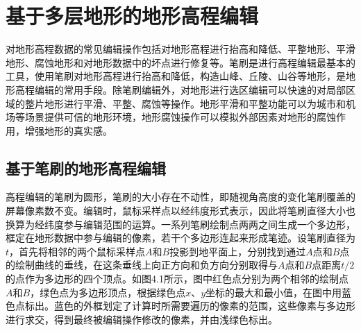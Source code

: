 
\chapter{基于多层地形的地形高程编辑}
对地形高程数据的常见编辑操作包括对地形高程进行抬高和降低、平整地形、平滑地形、腐蚀地形和对地形数据中的坏点进行修复等。笔刷是进行高程编辑最基本的工具，使用笔刷对地形高程进行抬高和降低，构造山峰、丘陵、山谷等地形，是地形高程编辑的常用手段。除笔刷编辑外，对地形进行选区编辑可以快速的对局部区域的整片地形进行平滑、平整、腐蚀等操作。地形平滑和平整功能可以为城市和机场等场景提供可信的地形环境，地形腐蚀操作可以模拟外部因素对地形的腐蚀作用，增强地形的真实感。\par
\section{基于笔刷的地形高程编辑}
高程编辑的笔刷为圆形，笔刷的大小存在不动性，即随视角高度的变化笔刷覆盖的屏幕像素数不变。编辑时，鼠标采样点以经纬度形式表示，因此将笔刷直径大小也换算为经纬度参与编辑范围的运算。一系列笔刷绘制点两两之间生成一个多边形，框定在地形数据中参与编辑的像素，若干个多边形连起来形成笔迹。设笔刷直径为$t$，首先将相邻的两个鼠标采样点$A$和$B$投影到地平面上，分别找到通过$A$点和$B$点的绘制曲线的垂线，在这条垂线上向正方向和负方向分别取得与$A$点和$B$点距离$t/2$的点作为多边形的四个顶点。如图4.1所示，图中红色点分别为两个相邻的绘制点$A$和$B$，绿色点为多边形顶点，根据绿色点$x$、$y$坐标的最大和最小值，在图中用蓝色点标出。蓝色的外框划定了计算时所需要遍历的像素的范围，这些像素与多边形进行求交，得到最终被编辑操作修改的像素，并由浅绿色标出。\par

